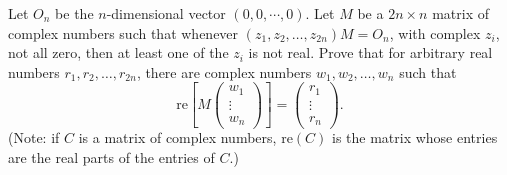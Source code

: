 Let $O_n$ be the $n$-dimensional vector $(0,0,\cdots, 0)$. Let $M$ be
a $2n \times n$ matrix of complex numbers such that whenever $(z_1,
z_2, \dots, z_{2n})M = O_n$, with complex $z_i$, not all zero, then at
least one of the $z_i$ is not real. Prove that for arbitrary real
numbers $r_1, r_2, \dots, r_{2n}$, there are complex numbers $w_1,
w_2, \dots, w_n$ such that
\[
\mathrm{re}\left[ M \left( \begin{array}{c} w_1 \\ \vdots \\ w_n \end{array}
\right) \right] = \left( \begin{array}{c} r_1 \\ \vdots \\ r_n
\end{array} \right).
\]
(Note: if $C$ is a matrix of complex numbers, $\mathrm{re}(C)$ is the matrix
whose entries are the real parts of the entries of $C$.)
